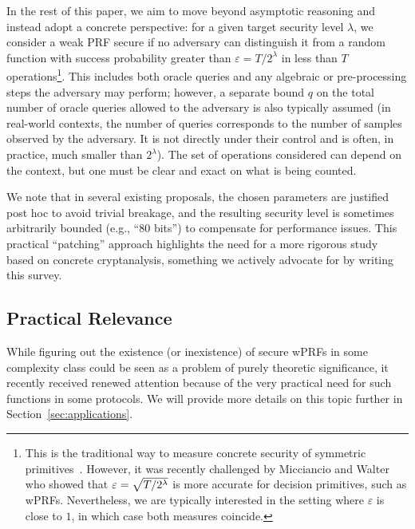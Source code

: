 In the rest of this paper, we aim to move beyond asymptotic reasoning and instead adopt a concrete perspective: for a given target security level $\lambda$, we consider a weak PRF secure if no adversary can distinguish it from a random function with success probability greater than $\varepsilon = T/2^\lambda$ in less than $T$ operations\footnote{This is the traditional way to measure concrete security of symmetric primitives~\cite{C:DodSte09}. However, it was recently challenged by Micciancio and Walter~\cite{EC:MicWal18} who showed that $\varepsilon = \sqrt{T/2^\lambda}$ is more accurate for decision primitives, such as wPRFs. Nevertheless, we are typically interested in the setting where $\varepsilon$ is close to $1$, in which case both measures coincide.}. This includes both oracle queries and any algebraic or pre-processing steps the adversary may perform; however, a separate bound $q$ on the total number of oracle queries allowed to the adversary is also typically assumed (in real-world contexts, the number of queries corresponds to the number of samples observed by the adversary. It is not directly under their control and is often, in practice, much smaller than $2^\lambda$). The set of operations considered can depend on the context, but one must be clear and exact on what is being counted.

We note that in several existing proposals, the chosen parameters are justified post hoc to avoid trivial breakage, and the resulting security level is sometimes arbitrarily bounded (e.g., ``80 bits'') to compensate for performance issues. This practical “patching” approach highlights the need for a more rigorous study based on concrete cryptanalysis, something we actively advocate for by writing this survey.



\subsection{Practical Relevance}

While figuring out the existence (or inexistence) of secure wPRFs in some complexity class could be seen as a problem of  purely theoretic significance, it recently received renewed attention because of the very practical need for such functions in some protocols. We will provide more details on this topic further in Section~\ref{sec:applications}.

